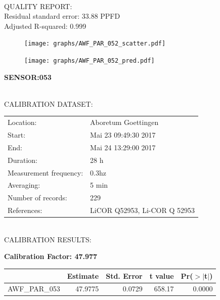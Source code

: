 \documentclass[oneside]{report}
\begin{document}
\hrulefill\\
QUALITY REPORT:\\
Residual standard error: 33.88 PPFD\\
Adjusted R-squared: 0.999



\begin{figure}[H]
  \centering
  \texttt{[image: graphs/AWF\_PAR\_052\_scatter.pdf]}
\end{figure}




\begin{figure}[H]
  \centering
  \texttt{[image: graphs/AWF\_PAR\_052\_pred.pdf]}
\end{figure}

\pagebreak


\begin{center}
\large{\textbf{SENSOR:053}}\\
\end{center}

\hrulefill\\
CALIBRATION DATASET:\\
\begin{table}[h!]
  \centering
  \label{tab:table1}
  \begin{tabular}{ll}
    Location: & Aboretum Goettingen\\ 
    
    
    Start:  & Mai 23 09:49:30 2017 \\
    End:   & Mai 24 13:29:00 2017\\ 
    Duration: & 28 h\\
    Measurement frequency: & 0.3hz\\
    Averaging:  &5 min\\
    Number of records: & 229 \\
    References: & LiCOR Q52953, Li-COR Q 52953 \\
  \end{tabular}
\end{table}

\hrulefill\\
CALIBRATION RESULTS:\\


\begin{center}
\textbf{\large{Calibration Factor: 47.977}}\\
\end{center}
\begin{table}[ht]
\centering
\begin{tabular}{rrrrr}
  \hline
 & Estimate & Std. Error & t value & Pr($>$$|$t$|$) \\ 
  \hline
AWF\_PAR\_053 & 47.9775 & 0.0729 & 658.17 & 0.0000 \\ 
   \hline
\end{tabular}
\end{table}
\end{document}
